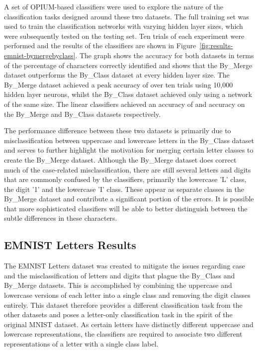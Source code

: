 \documentclass[conference]{IEEEtran}
\begin{document}
A set of OPIUM-based classifiers were used to explore the nature of the classification tasks designed around these two datasets. The full training set was used to train the classification networks with varying hidden layer sizes, which were subsequently tested on the testing set. Ten trials of each experiment were performed and the results of the classifiers are shown in Figure~\ref{fig:results-emnist-bymergebyclass}. The graph shows the accuracy for both datasets in terms of the percentage of characters correctly identified and shows that the By\_Merge dataset outperforms the By\_Class dataset at every hidden layer size. The By\_Merge dataset achieved a peak accuracy of  over ten trials using 10,000 hidden layer neurons, whilst the By\_Class dataset achieved only  using a network of the same size. The linear classifiers achieved an accuracy of   and  accuracy on the By\_Merge and By\_Class datasets respectively.

The performance difference between these two datasets is primarily due to misclassification between uppercase and lowercase letters in the By\_Class dataset and serves to further highlight the motivation for merging certain letter classes to create the By\_Merge dataset. Although the By\_Merge dataset does correct much of the case-related misclassification, there are still several letters and digits that are commonly confused by the classifiers, primarily the lowercase 'L' class, the digit '1' and the lowercase 'I' class. These appear as separate classes in the By\_Merge dataset and contribute a significant portion of the errors. It is possible that more sophisticated classifiers will be able to better distinguish between the subtle differences in these characters. 

\subsection{EMNIST Letters Results}
\label{sec:results-letters}

The EMNIST Letters dataset was created to mitigate the issues regarding case and the misclassification of letters and digits that plague the By\_Class and By\_Merge datasets. This is accomplished by combining the uppercase and lowercase versions of each letter into a single class and removing the digit classes entirely. This dataset therefore provides a different classification task from the other datasets and poses a letter-only classification task in the spirit of the original MNIST dataset. As certain letters have distinctly different uppercase and lowercase representations, the classifiers are required to associate two different representations of a letter with a single class label. 
\end{document}
